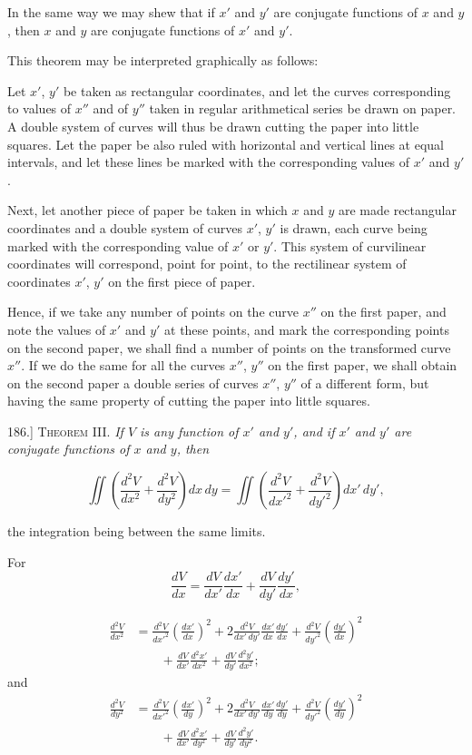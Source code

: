 \documentclass[11pt,a4paper]{article}
\begin{document}
In the same way we may shew that if $x'$ and $y'$ are conjugate functions of $x$ and $y$, then $x$ and $y$ are conjugate functions of $x'$ and $y'$.

This theorem may be interpreted graphically as follows:

Let $x'$, $y'$ be taken as rectangular coordinates, and let the curves corresponding to values of $x''$ and of $y''$ taken in regular arithmetical series be drawn on paper. A double system of curves will thus be drawn cutting the paper into little squares. Let the paper be also ruled with horizontal and vertical lines at equal intervals, and let these lines be marked with the corresponding values of $x'$ and $y'$.

Next, let another piece of paper be taken in which $x$ and $y$ are made rectangular coordinates and a double system of curves $x'$, $y'$ is drawn, each curve being marked with the corresponding value of $x'$ or $y'$. This system of curvilinear coordinates will correspond, point for point, to the rectilinear system of coordinates $x'$, $y'$ on the first piece of paper.

Hence, if we take any number of points on the curve $x''$ on the first paper, and note the values of $x'$ and $y'$ at these points, and mark the corresponding points on the second paper, we shall find a number of points on the transformed curve $x''$. If we do the same for all the curves $x''$, $y''$ on the first paper, we shall obtain on the second paper a double series of curves $x''$, $y''$ of a different form, but having the same property of cutting the paper into little squares.

186.] \textsc{Theorem III.} \textit{If $V$ is any function of $x'$ and $y'$, and if $x'$ and $y'$ are conjugate functions of $x$ and $y$, then}

\[
\iint\left(\frac{d^2V}{dx^2}+\frac{d^2V}{dy^2}\right)dx\,dy
=
\iint\left(\frac{d^2V}{dx'^2}+\frac{d^2V}{dy'^2}\right)dx'\,dy',
\]

the integration being between the same limits.

For
\[
\frac{dV}{dx}
= \frac{dV}{dx'}\frac{dx'}{dx}
 +\frac{dV}{dy'}\frac{dy'}{dx},
\]

\[
\begin{split}
\frac{d^2V}{dx^2}
&= \frac{d^2V}{dx'^2}\left(\frac{dx'}{dx}\right)^2
 +2\frac{d^2V}{dx'\,dy'}\frac{dx'}{dx}\frac{dy'}{dx}
 +\frac{d^2V}{dy'^2}\left(\frac{dy'}{dx}\right)^2\\
&\qquad
 +\frac{dV}{dx'}\frac{d^2x'}{dx^2}
 +\frac{dV}{dy'}\frac{d^2y'}{dx^2};
\end{split}
\]
and
\[
\begin{split}
\frac{d^2V}{dy^2}
&= \frac{d^2V}{dx'^2}\left(\frac{dx'}{dy}\right)^2
 +2\frac{d^2V}{dx'\,dy'}\frac{dx'}{dy}\frac{dy'}{dy}
 +\frac{d^2V}{dy'^2}\left(\frac{dy'}{dy}\right)^2\\
&\qquad
 +\frac{dV}{dx'}\frac{d^2x'}{dy^2}
 +\frac{dV}{dy'}\frac{d^2y'}{dy^2}.
\end{split}
\]
\end{document}
